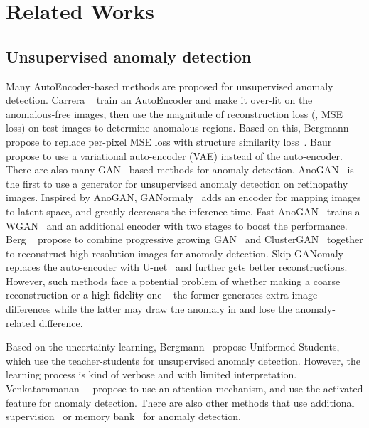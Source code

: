 \documentclass[final]{cvpr}
\begin{document}
\section{Related Works}

\subsection{Unsupervised anomaly detection}

Many AutoEncoder-based methods are proposed for unsupervised anomaly detection.
Carrera \etal~\cite{A:carrera2016defect} train an AutoEncoder and make it over-fit on the anomalous-free images, then use the magnitude of reconstruction loss (\ie, MSE loss) on test images to determine anomalous regions. Based on this, Bergmann \etal~\cite{A:bergmann2018improving} propose to replace per-pixel MSE loss with structure similarity loss~\cite{B:wang2004SSIM}. 
Baur~\etal~\cite{A:baur2018deep} propose to use a variational auto-encoder (VAE) instead of the auto-encoder. There are also many GAN~\cite{B:radford2015DCGAN} based methods for anomaly detection. AnoGAN~\cite{A:schlegl2017unsupervised} is the first to use a generator for unsupervised anomaly detection on retinopathy images. Inspired by AnoGAN, GANormaly~\cite{A:akcay2018ganomaly} adds an encoder for mapping images to latent space, and greatly decreases the inference time. Fast-AnoGAN~\cite{A:schlegl2019fastAnnoGAN} trains a WGAN~\cite{B:arjovsky2017WGAN} and an additional encoder with two stages to boost the performance. 
Berg \etal~\cite{A:berg2019unsupervised} propose to combine progressive growing GAN~\cite{B:karras2017progressive} and ClusterGAN~\cite{A:mukherjee2019clustergan} together to reconstruct high-resolution images for anomaly detection.
Skip-GANomaly~\cite{A:akccay2019skip} replaces the auto-encoder with U-net~\cite{A:ronneberger2015unet} and further gets better reconstructions. 
However, such methods face a potential problem of whether making a coarse reconstruction or a high-fidelity one – the former generates extra image differences while the latter may draw the anomaly in and lose the anomaly-related difference.

Based on the uncertainty learning, Bergmann~\etal\cite{A:bergmann2020uninformed} propose Uniformed Students, which use the teacher-students for unsupervised anomaly detection. However, the learning process is kind of verbose and with limited interpretation. 
Venkataramanan~\etal~\cite{A:venkataramanan2020attention} propose to use an attention mechanism, and use the activated feature for anomaly detection. There are also other methods that use additional supervision~\cite{A:zhou2020encoding} or memory bank~\cite{A:gong2019memorizing} for anomaly detection. 
\end{document}
